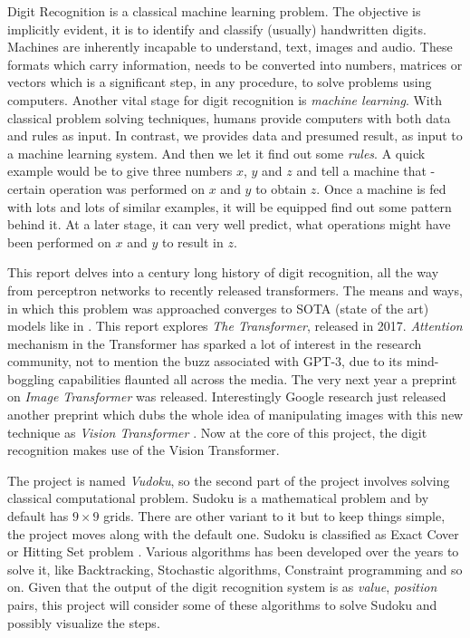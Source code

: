 \documentclass[12pt, a4paper]{report}
\begin{document}
\hspace{0.5cm} Digit Recognition is a classical machine learning problem. The objective is implicitly evident, it is to identify and classify (usually) handwritten digits. Machines are inherently incapable to understand, text, images and audio. These formats which carry information, needs to be converted into numbers, matrices or vectors which is a significant step, in any procedure, to solve problems using computers. Another vital stage for digit recognition is \emph{machine learning}. With classical problem solving techniques, humans provide computers with both data and rules as input. In contrast, we provides data and presumed result, as input to a machine learning system. And then we let it find out some \emph{rules}. A quick example would be to give three numbers $x$, $y$ and $z$ and tell a machine that - certain operation was performed on $x$ and $y$ to obtain $z$. Once a machine is fed with lots and lots of similar examples, it will be equipped find out some pattern behind it. At a later stage, it can very well predict, what operations might have been performed on $x$ and $y$ to result in $z$.

This report delves into a century long history of digit recognition, all the way from perceptron networks to recently released transformers. The means and ways, in which this problem was approached converges to SOTA (state of the art) models like in \cite{art:edrdcnn}. This report explores \emph{The Transformer}, released in 2017. \emph{Attention} mechanism in the Transformer \cite{2017arXiv170603762V} has sparked a lot of interest in the research community, not to mention the buzz associated with GPT-3, due to its mind-boggling capabilities flaunted all across the media. The very next year a preprint on \emph{Image Transformer} \cite{2018arXiv180205751P} was released. Interestingly Google research just released another preprint which dubs the whole idea of manipulating images with this new technique as \emph{Vision Transformer} \cite{2020arXiv201011929D}. Now at the core of this project, the digit recognition makes use of the Vision Transformer.

The project is named \emph{Vudoku}, so the second part of the project involves solving classical computational problem. Sudoku is a mathematical problem and by default has $9\times 9$ grids. There are other variant to it but to keep things simple, the project moves along with the default one. Sudoku is classified as Exact Cover or Hitting Set problem \cite{wiki:exactcover}. Various algorithms has been developed over the years to solve it, like Backtracking, Stochastic algorithms, Constraint programming and so on. Given that the output of the digit recognition system is as \emph{value}, \emph{position} pairs, this project will consider some of these algorithms to solve Sudoku and possibly visualize the steps.
\vspace*{\fill}
\end{document}
